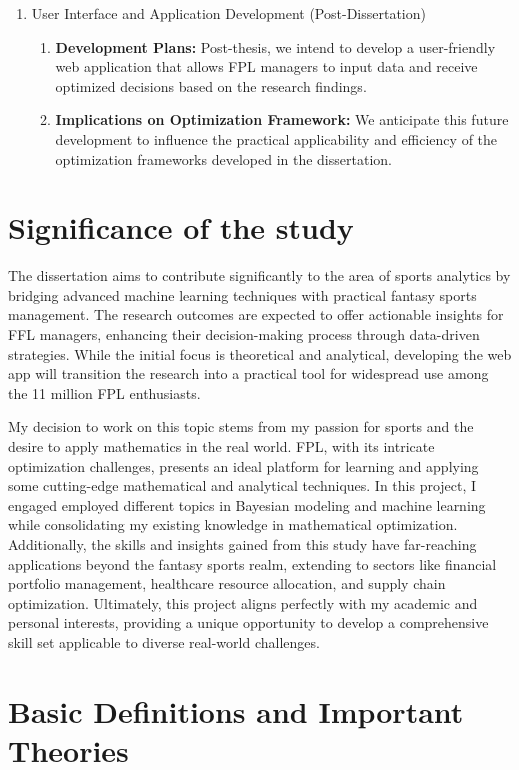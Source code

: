 \documentclass[12pt,oneside,a4paper]{book}
\theoremstyle{definition}
\theoremstyle{remark}
\begin{document}
\begin{enumerate}
				\item[(iv)] User Interface and Application Development (Post-Dissertation)
				\begin{enumerate}
					\item \textbf{Development Plans:} Post-thesis, we intend to develop a user-friendly web application that allows FPL managers to input data and receive optimized decisions based on the research findings.

					\item \textbf{Implications on Optimization Framework:} We anticipate this future development to influence the practical applicability and efficiency of the optimization frameworks developed in the dissertation.
				\end{enumerate}
			\end{enumerate}


		\section{Significance of the study}
			The dissertation aims to contribute significantly to the area of sports analytics by bridging advanced machine learning techniques with practical fantasy sports management.
			The research outcomes are expected to offer actionable insights for FFL managers, enhancing their decision-making process through data-driven strategies.
			While the initial focus is theoretical and analytical, developing the web app will transition the research into a practical tool for widespread use among the 11 million FPL enthusiasts.

			My decision to work on this topic stems from my passion for sports and the desire to apply mathematics in the real world. FPL, with its intricate optimization challenges, presents an ideal platform for learning and applying some cutting-edge mathematical and analytical techniques. In this project, I engaged employed different topics in Bayesian modeling and machine learning while consolidating my existing knowledge in mathematical optimization. Additionally, the skills and insights gained from this study have far-reaching applications beyond the fantasy sports realm, extending to sectors like financial portfolio management, healthcare resource allocation, and supply chain optimization. Ultimately, this project aligns perfectly with my academic and personal interests, providing a unique opportunity to develop a comprehensive skill set applicable to diverse real-world challenges.

		\section{Basic Definitions and Important Theories}
\end{document}
